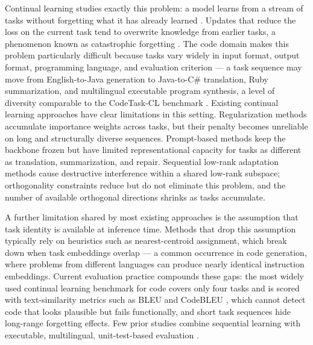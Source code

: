 Continual learning studies exactly this problem: a model learns from a stream of tasks without forgetting what it has already learned \citep{parisi2019continual,delange2021continual}. Updates that reduce the loss on the current task tend to overwrite knowledge from earlier tasks, a phenomenon known as catastrophic forgetting \citep{mccloskey1989catastrophic,goodfellow2013empirical}. The code domain makes this problem particularly difficult because tasks vary widely in input format, output format, programming language, and evaluation criterion --- a task sequence may move from English-to-Java generation to Java-to-C\# translation, Ruby summarization, and multilingual executable program synthesis, a level of diversity comparable to the CodeTask-CL benchmark \citep{yadav2023exploring}. Existing continual learning approaches have clear limitations in this setting. Regularization methods \citep{kirkpatrick2017overcoming,zenke2017continual,aljundi2018memory} accumulate importance weights across tasks, but their penalty becomes unreliable on long and structurally diverse sequences. Prompt-based methods \citep{wang2022learning,razdaibiedina2023progressive} keep the backbone frozen but have limited representational capacity for tasks as different as translation, summarization, and repair. Sequential low-rank adaptation methods \citep{wang2023orthogonal,wang2025continual,qian2025treelora} cause destructive interference within a shared low-rank subspace; orthogonality constraints reduce but do not eliminate this problem, and the number of available orthogonal directions shrinks as tasks accumulate.

A further limitation shared by most existing approaches is the assumption that task identity is available at inference time. Methods that drop this assumption typically rely on heuristics such as nearest-centroid assignment, which break down when task embeddings overlap --- a common occurrence in code generation, where problems from different languages can produce nearly identical instruction embeddings. Current evaluation practice compounds these gaps: the most widely used continual learning benchmark for code \citep{yadav2023exploring} covers only four tasks and is scored with text-similarity metrics such as BLEU \citep{papineni2002bleu} and CodeBLEU \citep{ren2020codebleu}, which cannot detect code that looks plausible but fails functionally, and short task sequences hide long-range forgetting effects. Few prior studies combine sequential learning with executable, multilingual, unit-test-based evaluation \citep{chen2021evaluating,cassano2023multipl}.

